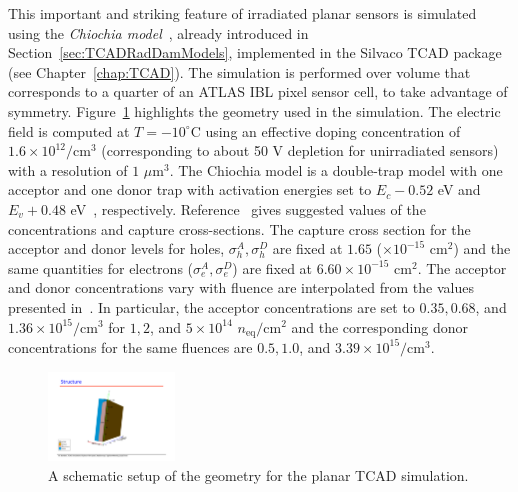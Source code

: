 This important and striking feature of irradiated planar sensors is simulated using the \textit{Chiochia model}~\cite{CHIOCHIA2006}, already introduced in Section~\ref{sec:TCADRadDamModels}, implemented in the Silvaco TCAD package (see Chapter~\ref{chap:TCAD}).  The simulation is performed over volume that corresponds to a quarter of an ATLAS IBL pixel sensor cell, to take advantage of symmetry.  Figure~\ref{fig:planarsetup} highlights the geometry used in the simulation.   The electric field is computed at $T=-10^{\circ}$C using an effective doping concentration of $1.6\times 10^{12}/\text{cm}^3$ (corresponding to about 50 V depletion for unirradiated sensors) with a resolution of $1$ $\text{$\mu$m}^3$.  The Chiochia model is a double-trap model with one acceptor and one donor trap with activation energies set to $E_c-0.52$ eV and $E_v+0.48$ eV~\cite{bib:DP}, respectively.  Reference~\cite{CHIOCHIA2006} gives suggested values of the concentrations and capture cross-sections.  The capture cross section for the acceptor and donor levels for holes, $\sigma_h^A,\sigma_h^D$ are fixed at $1.65$ ($\times 10^{-15}$ cm$^2$) and the same quantities for electrons ($\sigma_e^{A},\sigma_e^D$) are fixed at $6.60\times 10^{-15}$ cm$^2$.  The acceptor and donor concentrations vary with fluence are interpolated from the values presented in~\cite{CHIOCHIA2006}.  In particular, the acceptor concentrations are set to $0.35, 0.68$, and $1.36\times 10^{15}/\text{cm$^3$}$ for $1, 2$, and $5\times 10^{14}$ $n_\text{eq}/\text{cm}^2$ and the corresponding donor concentrations for the same fluences are $0.5, 1.0$, and $3.39\times 10^{15}/\text{cm$^3$}$.

\begin{figure}[!htpb]
\centering
\includegraphics[width=0.3\textwidth]{planar.pdf}
\caption{A schematic setup of the geometry for the planar TCAD simulation.}
\label{fig:planarsetup}
\end{figure}


